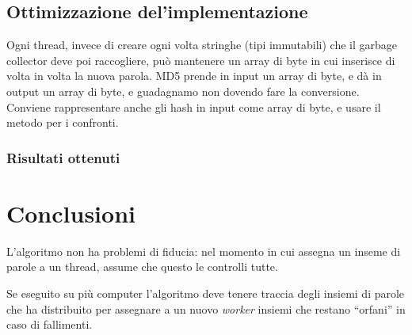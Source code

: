 \documentclass[]{myarticle}
\begin{document}
\subsection{Ottimizzazione del'implementazione}

Ogni thread, invece di creare ogni volta stringhe (tipi immutabili) che il garbage collector deve poi raccogliere, pu\`o mantenere un array di byte in cui inserisce di volta in volta la nuova parola.
MD5 prende in input un array di byte, e d\`a in output un array di byte, e guadagnamo non dovendo fare la conversione.
Conviene rappresentare anche gli hash in input come array di byte, e usare il metodo  per i confronti.


\subsubsection{Risultati ottenuti}


\section{Conclusioni}

L'algoritmo non ha problemi di fiducia: nel momento in cui assegna un inseme di parole a un thread, assume che questo le controlli tutte.

Se eseguito su pi\`u computer l'algoritmo deve tenere traccia degli insiemi di parole che ha distribuito per assegnare a un nuovo \emph{worker} insiemi che restano ``orfani'' in caso di fallimenti.
\end{document}
